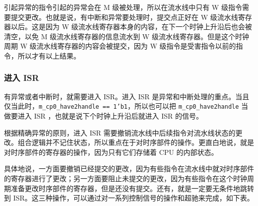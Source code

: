 \documentclass[12pt,AutoFakeBold,AutoFakeSlant]{article}
\newcommand{\ms}[1]{\texttt{#1}}
\begin{document}
引起异常的指令引起的异常会在 M 级被处理，所以在流水线中只有 W 级指令需要提交更改。也就是说，有中断和异常要处理时，提交点正好在 W 级流水线寄存器以后。这是因为 W 级流水线寄存器本身的内容，在下一个时钟上升沿后也会被清空，以免 M 级流水线寄存器的信息流水到 W 级流水线寄存器。但是这个时钟周期 W 级流水线寄存器的内容会被提交，因为 W 级指令是受害指令以前的指令，所以才有以上结果。

\subsubsection{进入 ISR}

有异常或者中断时，就需要进入 ISR。进入 ISR 是异常和中断处理的重点。当且仅当此时，\ms{m\_cp0\_have2handle == 1'b1}，所以也可以把 \ms{m\_cp0\_have2handle} 当做要进入 ISR ，也就是说下个时钟上升沿后就进入 ISR 的信号。

根据精确异常的原则，进入 ISR 需要撤销流水线中后续指令对流水线状态的更改。组合逻辑并不记住状态，所以重点在于对时序部件的操作。更直白地说，就是对时序部件的寄存器的操作，因为只有它们存储着 CPU 的内部状态。

具体地说，一方面要撤销已经提交的更改，因为有些指令在流水线中就对时序部件的寄存器进行了更改；另一方面要阻止未提交的更改，因为有些指令在这个时钟周期准备更改时序部件的寄存器，但是还没有提交。还有，就是一定要无条件地跳转到 ISR。这三种操作，可以通过对一系列控制信号的操作和超驰来完成，如下表。
\end{document}
